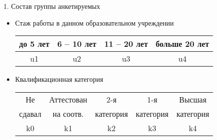 \begin{frame}{1.	Состав группы анкетируемых}
\begin{itemize}
\item Стаж работы в данном образовательном учреждении \\
\noindent
\begin{tabular}{|c|c|c|c|} \hline
 до 5 лет &  6 -- 10  лет &  11 -- 20 лет & больше 20 лет \\ \hline
 u1    &   u2      &  u3        & u4 \\ \hline
\end{tabular}

\item Квалификационная категория \\
\noindent
\begin{tabular}{|c|c|c|c|c|} \hline
 Не  &  Аттестован & 2-я &  1-я  & Высшая \\ 
 сдавал &  на соотв. & категория &  категория  & категория \\ \hline
 k0 & k1    &   k2      &  k3        & k4 \\ \hline
\end{tabular}

\end{itemize}
\end{frame}


